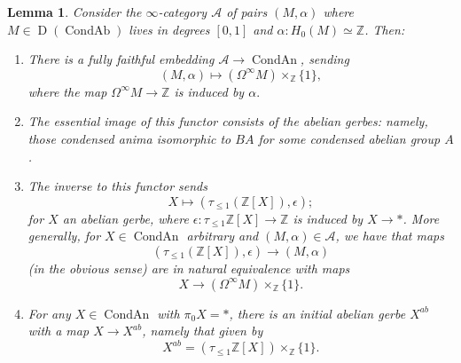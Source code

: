 \documentclass[10pt,a4paper]{amsart}
\newtheorem{lemma}{Lemma}
\newcommand{\mbb}{\mathbb}
\newcommand{\mc}{\mathcal}
\newcommand{\on}{\operatorname}
\begin{document}
\begin{lemma}\label{gerbe}
Consider the $\infty$-category $\mc{A}$ of pairs $(M,\alpha)$ where $M\in\on{D}(\on{CondAb})$ lives in degrees $[0,1]$ and $\alpha:H_0(M)\simeq\mbb{Z}$.  Then:
\begin{enumerate}
\item There is a fully faithful embedding $\mc{A} \to \on{CondAn}$, sending
$$(M,\alpha) \mapsto (\Omega^\infty M)\times_{\mbb{Z}} \{1\},$$
where the map $\Omega^\infty M\to\mbb{Z}$ is induced by $\alpha.$
\item The essential image of this functor consists of the \emph{abelian gerbes}: namely, those condensed anima isomorphic to $BA$ for some condensed abelian group $A$.
\item The inverse to this functor sends
$$X\mapsto (\tau_{\leq 1}(\mbb{Z}[X]),\epsilon);$$
for $X$ an abelian gerbe, where $\epsilon:\tau_{\leq 1}\mbb{Z}[X] \to \mbb{Z}$ is induced by $X\to \ast$.  More generally, for $X\in\on{CondAn}$ arbitrary and $(M,\alpha)\in\mc{A}$, we have that maps
$$(\tau_{\leq 1}(\mbb{Z}[X]),\epsilon) \to (M,\alpha)$$
(in the obvious sense) are in natural equivalence with maps
$$X \to (\Omega^\infty M)\times_{\mbb{Z}} \{1\}.$$
\item For any $X\in\on{CondAn}$ with $\pi_0X=\ast$, there is an initial abelian gerbe $X^{ab}$ with a map $X\to X^{ab}$, namely that given by
$$X^{ab} = (\tau_{\leq 1}\mbb{Z}[X])\times_{\mbb{Z}}\{1\}.$$
\end{enumerate}
\end{lemma}
\end{document}
